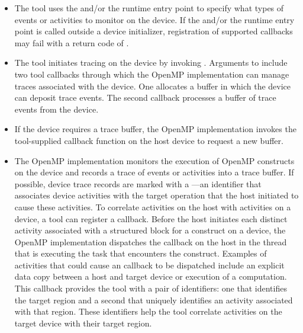 \begin{itemize}
\begin{table}
\end{table}

\item The tool uses the  and/or the 
       runtime entry point to specify what
      types of events or activities to monitor on the device. If the 
       and/or the  
      runtime entry point is called outside a device initializer, 
      registration of supported callbacks may fail with a return code of
  .
\item The tool initiates tracing on the device by invoking . 
      Arguments to  include two tool callbacks through which
      the OpenMP implementation can manage traces associated with the device. One 
      allocates a buffer in which the device can deposit trace events. The second 
      callback processes a buffer of trace events from the device.
\item If the device requires a trace buffer, the OpenMP implementation invokes the 
      tool-supplied callback function on the host device to request a new buffer.
\item The OpenMP implementation monitors the execution of OpenMP constructs on the 
      device and records a trace of events or activities into a trace buffer. If 
      possible, device trace records are marked with a ---an 
      identifier that associates device activities with the target operation that
      the host initiated to cause these activities. To correlate activities on the 
      host with activities on a device, a tool can register a 
       callback. Before the host initiates each 
      distinct activity associated with a structured block for a  
      construct on a device, the OpenMP implementation dispatches the 
       callback on the host in the thread that
      is executing the task that encounters the  construct. 
      Examples of activities that could cause an  
      callback to be dispatched include an explicit data copy between a host 
      and target device or execution of a computation. This callback provides 
      the tool with a pair of identifiers: one that identifies the target 
      region and a second that uniquely identifies an activity associated 
      with that region. These identifiers help the tool correlate activities 
      on the target device with their target region.

\end{itemize}
